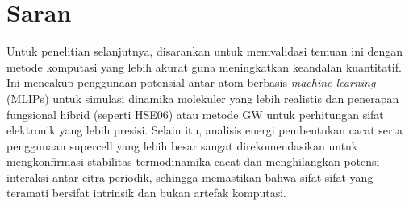 \section{Saran}
\label{sec:saran}
Untuk penelitian selanjutnya, disarankan untuk memvalidasi temuan ini dengan metode komputasi yang lebih akurat guna meningkatkan keandalan kuantitatif.
Ini mencakup penggunaan potensial antar-atom berbasis \emph{machine-learning} (MLIPs) untuk simulasi dinamika molekuler yang lebih realistis dan penerapan fungsional hibrid (seperti HSE06) atau metode GW untuk perhitungan sifat elektronik yang lebih presisi.
Selain itu, analisis energi pembentukan cacat serta penggunaan supercell yang lebih besar sangat direkomendasikan untuk mengkonfirmasi stabilitas termodinamika cacat dan menghilangkan potensi interaksi antar citra periodik, sehingga memastikan bahwa sifat-sifat yang teramati bersifat intrinsik dan bukan artefak komputasi.